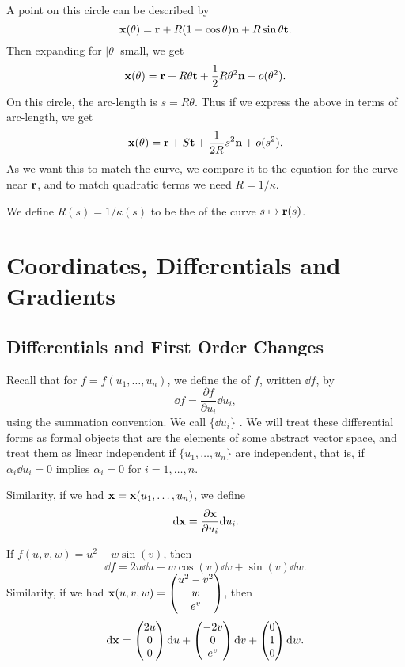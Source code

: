 \documentclass[a4paper]{scrreprt}
\begin{document}
A point on this circle can be described by
$$
\mathbf{x}(\theta) = \mathbf{r} + R(1 - \cos \theta) \mathbf{n} + R \sin \theta \mathbf{t}.
$$
Then expanding for $|\theta|$ small, we get
$$
\mathbf{x} (\theta) = \mathbf{r} + R \theta \mathbf{t} + \frac{1}{2} R \theta^2 \mathbf{n} + o(\theta^2).
$$
On this circle, the arc-length is $s = R \theta$. Thus if we express the above in terms of arc-length, we get
$$
\mathbf{x}(\theta) = \mathbf{r} + S \mathbf{t} + \frac{1}{2R} s^2 \mathbf{n} + o(s^2).
$$
As we want this to match the curve, we compare it to the equation for the curve near $\mathbf{r}$, and to match quadratic terms we need
$R = 1/\kappa$.

\begin{definition}
	We define $R(s)=1/\kappa(s)$ to be the  of the curve $s \mapsto \mathbf{r}(s)$.
\end{definition}

\chapter{Coordinates, Differentials and Gradients}

\section{Differentials and First Order Changes}

Recall that for $f = f(u_1, \dots, u_n)$, we define the  of $f$, written $\dd f$, by
$$
\dd f = \frac{\partial f}{\partial u_i} \dd u_i,
$$
using the summation convention. We call $\{\dd u_i\}$ . We will treat these differential forms as formal objects that are the elements of some abstract vector space, and treat them as linear independent if $\{u_1,  \dots, u_n\}$ are independent, that is, if $\alpha_i \dd u_i = 0$ implies $\alpha_i = 0$ for $i = 1, \dots, n$.

Similarity, if we had $\mathbf{x} = \mathbf{x}(u_1, \dots, u_n)$, we define
$$
\mathrm{d} \mathbf{x} = \frac{\partial \mathbf{x}}{\partial u_i} \mathrm{d} u_i.
$$

\begin{example}
	If $f(u, v, w) = u^2 + w\sin(v)$, then
	$$
	\dd f = 2 u \dd u + w \cos (v) \dd v + \sin (v) \dd w.
$$
Similarity, if we had $\mathbf{x}(u, v, w) = \begin{pmatrix}
	u^2 - v^2 \\ w \\ e^v
\end{pmatrix}$, then
$$
\mathrm{d} \mathbf{x} = \begin{pmatrix}
	2u \\ 0 \\ 0\end{pmatrix}
 \mathrm{d} u + \begin{pmatrix}
	 - 2v \\ 0 \\ e^v
 \end{pmatrix} \mathrm{d} v + \begin{pmatrix}
	 0 \\ 1 \\ 0
 \end{pmatrix} \mathrm{d} w.
$$
\end{example}
\end{document}
